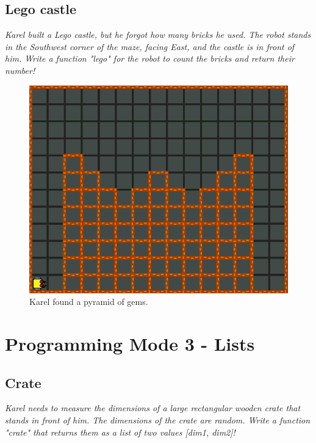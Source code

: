 \subsection{Lego castle}

{\em Karel built a Lego castle, but he forgot how many bricks he used. The robot stands in the Southwest corner of the maze, facing East, and the castle is in front of him. Write a function "lego" for the robot to count the bricks and return their number!}\\[-9mm]

\begin{figure}[!ht]
\begin{center}
\includegraphics[height=0.4\textwidth]{img/f14n.png}
\end{center}
\vspace{-4mm}
\caption{Karel found a pyramid of gems.}
\label{fig:f14n}
\vspace{-1cm}
\end{figure}



\section{Programming Mode 3 - Lists}

\subsection{Crate}

{\em Karel needs to measure the dimensions of a large rectangular wooden crate that stands in front of him. The dimensions of the crate are random. Write a function "crate" that returns them as a list of two values [dim1, dim2]!}\\[-9mm]

